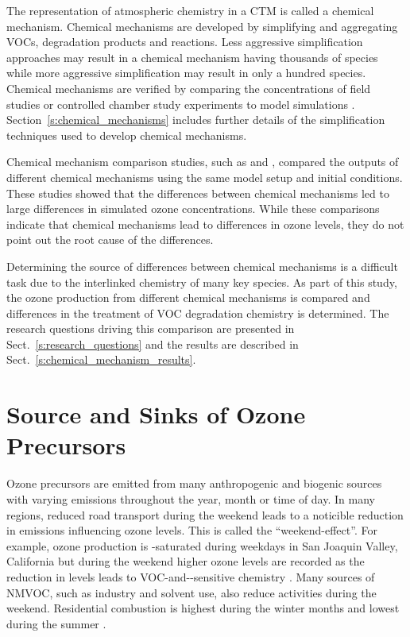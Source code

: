 The representation of atmospheric chemistry in a CTM is called a chemical mechanism.
Chemical mechanisms are developed by simplifying and aggregating VOCs, degradation products and reactions.
Less aggressive simplification approaches may result in a chemical mechanism having thousands of species while more aggressive simplification may result in only a hundred species. 
Chemical mechanisms are verified by comparing the concentrations of field studies or controlled chamber study experiments to model simulations \citep{Stockwell:2012}.
Section~\ref{s:chemical_mechanisms} includes further details of the simplification techniques used to develop chemical mechanisms.

Chemical mechanism comparison studies, such as \citet{Kuhn:1998} and \citet{Emmerson:2009}, compared the outputs of different chemical mechanisms using the same model setup and initial conditions.
These studies showed that the differences between chemical mechanisms led to large differences in simulated ozone concentrations.
While these comparisons indicate that chemical mechanisms lead to differences in ozone levels, they do not point out the root cause of the differences.

Determining the source of differences between chemical mechanisms is a difficult task due to the interlinked chemistry of many key species.
As part of this study, the ozone production from different chemical mechanisms is compared and differences in the treatment of VOC degradation chemistry is determined.
The research questions driving this comparison are presented in Sect.~\ref{s:research_questions} and the results are described in Sect.~\ref{s:chemical_mechanism_results}.

\section{Source and Sinks of Ozone Precursors} \label{s:precursor_emissions}
Ozone precursors are emitted from many anthropogenic and biogenic sources with varying emissions throughout the year, month or time of day.
In many regions, reduced road transport during the weekend leads to a noticible reduction in  emissions influencing ozone levels.
This is called the ``weekend-effect''.
For example, ozone production is -saturated during weekdays in San Joaquin Valley, California but during the weekend higher ozone levels are recorded as the reduction in  levels leads to VOC-and--sensitive chemistry \citep{Pusede:2014}.
Many sources of NMVOC, such as industry and solvent use, also reduce activities during the weekend.
Residential combustion is highest during the winter months and lowest during the summer \citep{Gon:2011}.

